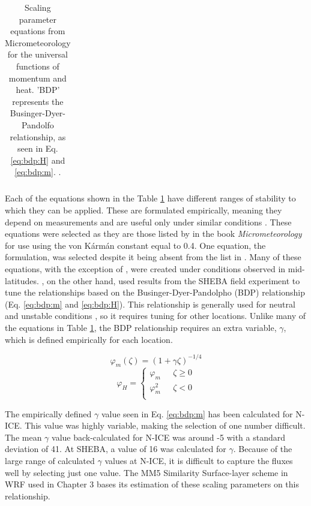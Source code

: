 {\begin{table}[p]
\begin{tabular}{| c | c |}
        \hline
    \end{tabular}
    \caption[Scaling parameter equations.]{Scaling parameter equations from Micrometeorology \citep{foken:2008} for the universal functions of momentum and heat. 'BDP' represents the Businger-Dyer-Pandolfo relationship, as seen in Eq. \ref{eq:bdp:H} and \ref{eq:bdp:m}. \citep{foken:2008}.}
    \label{tab:stability}
\end{table}}

Each of the equations shown in the Table \ref{tab:stability} have different ranges of stability to which they can be applied. These are formulated empirically, meaning they depend on measurements and are useful only under similar conditions \citep{stull:1988, foken:2008}. These equations were selected as they are those listed by \citet{foken:2008} in the book \textit{Micrometeorology} for use using the von K\'{a}rm\'{a}n constant equal to 0.4. One equation, the \citet{andreas:2010} formulation, was selected despite it being absent from the list in \citet{foken:2008}. Many of these equations, with the exception of \citet{andreas:2010}, were created under conditions observed in mid-latitudes. \citet{andreas:2010}, on the other hand, used results from the SHEBA field experiment to tune the relationships based on the Businger-Dyer-Pandolpho (BDP) relationship (Eq. \ref{eq:bdp:m} and \ref{eq:bdp:H}). This relationship is generally used for neutral and unstable conditions \citep{foken:2008}, so it requires tuning for other locations. Unlike many of the equations in Table \ref{tab:stability}, the BDP relationship requires an extra variable, $\gamma$, which is defined empirically for each location.

\begin{equation}\label{eq:bdp:m}
\varphi_{m}(\zeta) = (1 + \gamma \zeta)^{-1/4}
\end{equation}
\begin{equation}\label{eq:bdp:H}
\varphi_{H} = \begin{cases} 
\varphi_{m} & \text{    } \zeta \geq 0 \\ 
\varphi_{m}^{2} & \text{    } \zeta < 0 \\ 
\end{cases}
\end{equation}

The empirically defined $\gamma$ value seen in Eq. \ref{eq:bdp:m} \citep{paulson:1970, chen:2001} has been calculated for N-ICE. This value was highly variable, making the selection of one number difficult. The mean $\gamma$ value back-calculated for N-ICE was around -5 with a standard deviation of 41. At SHEBA, a value of 16 was calculated for $\gamma$. Because of the large range of calculated $\gamma$ values at N-ICE, it is difficult to capture the fluxes well by selecting just one value. The MM5 Similarity Surface-layer scheme in WRF \citep{paulson:1970} used in Chapter 3 bases its estimation of these scaling parameters on this relationship.

